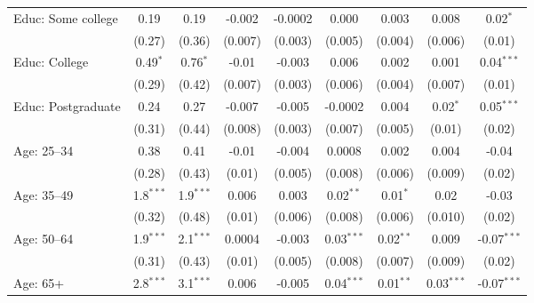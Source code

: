 \begin{adjustbox}{width = \textwidth, center}
\begin{tabular}{lcccccccc}
      Educ: Some college      & 0.19         & 0.19         & -0.002       & -0.0002       & 0.000   & 0.003                 & 0.008        & 0.02$^{*}$\\   
                              & (0.27)       & (0.36)       & (0.007)      & (0.003)       & (0.005)               & (0.004)               & (0.006)      & (0.01)\\   
      Educ: College           & 0.49$^{*}$   & 0.76$^{*}$   & -0.01        & -0.003        & 0.006                 & 0.002                 & 0.001        & 0.04$^{***}$\\   
                              & (0.29)       & (0.42)       & (0.007)      & (0.003)       & (0.006)               & (0.004)               & (0.007)      & (0.01)\\   
      Educ: Postgraduate      & 0.24         & 0.27         & -0.007       & -0.005        & -0.0002               & 0.004                 & 0.02$^{*}$   & 0.05$^{***}$\\   
                              & (0.31)       & (0.44)       & (0.008)      & (0.003)       & (0.007)               & (0.005)               & (0.01)       & (0.02)\\   
      Age: 25--34             & 0.38         & 0.41         & -0.01        & -0.004        & 0.0008                & 0.002                 & 0.004        & -0.04\\   
                              & (0.28)       & (0.43)       & (0.01)       & (0.005)       & (0.008)               & (0.006)               & (0.009)      & (0.02)\\   
      Age: 35--49             & 1.8$^{***}$  & 1.9$^{***}$  & 0.006        & 0.003         & 0.02$^{**}$           & 0.01$^{*}$            & 0.02         & -0.03\\   
                              & (0.32)       & (0.48)       & (0.01)       & (0.006)       & (0.008)               & (0.006)               & (0.010)      & (0.02)\\   
      Age: 50--64             & 1.9$^{***}$  & 2.1$^{***}$  & 0.0004       & -0.003        & 0.03$^{***}$          & 0.02$^{**}$           & 0.009        & -0.07$^{***}$\\   
                              & (0.31)       & (0.43)       & (0.01)       & (0.005)       & (0.008)               & (0.007)               & (0.009)      & (0.02)\\   
      Age: 65+                & 2.8$^{***}$  & 3.1$^{***}$  & 0.006        & -0.005        & 0.04$^{***}$          & 0.01$^{**}$           & 0.03$^{***}$ & -0.07$^{***}$\\   

\end{tabular}
\end{adjustbox}
